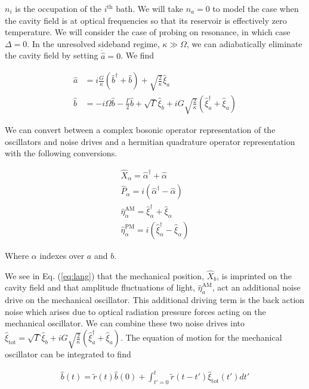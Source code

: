 \documentclass[12pt]{article}
\newcommand{\nn}{\nonumber}
\begin{document}
$n_i$ is the occupation of the $i^{\text{th}}$ bath. We will take $n_a =0$ to model the case when the cavity field is at optical frequencies so that its reservoir is effectively zero temperature.
We will consider the case of probing on resonance, in which case $\Delta = 0$. In the unresolved sideband regime, $\kappa \gg \Omega$, we can adiabatically eliminate the cavity field by setting $\dot{\hat{a}} = 0$. We find

\begin{align}
\label{eq:lang}
\hat{a} &= i \frac{G}{\kappa}\left(\hat{b}^{\dag} + \hat{b}\right) + \sqrt{\frac{2}{\kappa}} \hat{\xi}_a\\
\hat{b} &= -i\Omega \hat{b} - \frac{\Gamma}{2} \hat{b} + \sqrt{\Gamma} \hat{\xi}_b + i G \sqrt{\frac{2}{\kappa}} \left(\hat{\xi}^{\dag}_a + \hat{\xi}_a\right) \nn
\end{align}

We can convert between a complex bosonic operator representation of the oscillators and noise drives and a hermitian quadrature operator representation with the following conversions.

\begin{align}
\hat{X}_{\alpha} = \hat{\alpha}^{\dag} + \hat{\alpha}\\
\hat{P}_{\alpha} = i\left(\hat{\alpha}^{\dag} - \hat{\alpha}\right) \nn\\
\hat{\eta}^{\text{AM}}_{\alpha} = \hat{\xi}_{\alpha}^{\dag} + \hat{\xi}_{\alpha} \nn\\
\hat{\eta}^{\text{PM}}_{\alpha} = i\left(\hat{\xi}_{\alpha}^{\dag} - \hat{\xi}_{\alpha}\right) \nn
\end{align}

Where $\alpha$ indexes over $a$ and $b$.

We see in Eq. (\ref{eq:lang}) that the mechanical position, $\hat{X}_b$, is imprinted on the cavity field and that amplitude fluctuations of light, $\hat{\eta}^{\text{AM}}_a$, act an additional noise drive on the mechanical oscillator. This additional driving term is the back action noise which arises due to optical radiation pressure forces acting on the mechanical oscillator. We can combine these two noise drives into $\hat{\xi}_{\text{tot}} = \sqrt{\Gamma} \hat{\xi}_b + i G \sqrt{\frac{2}{\kappa}} \left(\hat{\xi}^{\dag}_a + \hat{\xi}_a\right)$. The equation of motion for the mechanical oscillator can be integrated to find

\begin{align}
\hat{b}(t) =\tilde{r}(t)\hat{b}(0) + \int_{t'=0}^t \tilde{r}(t-t') \hat{\xi}_{\text{tot}}(t') dt'
\end{align}
\end{document}
